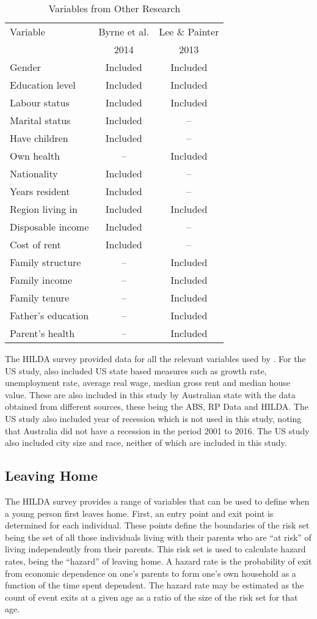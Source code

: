 \documentclass[12pt]{article}
\begin{document}
\begin{table}[htpb]
\centering
\caption{Variables from Other Research}
\label{HILDAvar}
\tabularnewline
\begin{tabular}{lcc}
\toprule
Variable & Byrne et al. & Lee \& Painter  \\
& 2014 & 2013  \\
\midrule
Gender & Included & Included \\
Education level & Included & Included \\
Labour status & Included & Included \\
Marital status & Included & -- \\
Have children & Included & -- \\
Own health & -- & Included \\
Nationality & Included & -- \\
Years resident & Included & -- \\
Region living in  & Included & Included \\
Disposable income & Included & -- \\
Cost of rent & Included & -- \\
Family structure & -- & Included \\
Family income & -- & Included \\
Family tenure & -- & Included \\
Father's education & -- & Included \\
Parent's health & -- & Included \\
\bottomrule
\end{tabular}
\end{table}

The HILDA survey provided data for all the relevant variables used by \cite{byrne2014household}. For the US study, \cite{lee2013happens} also included US state based measures such as growth rate, unemployment rate, average real wage, median gross rent and median house value. These are also included in this study by Australian state with the data obtained from different sources, these being the ABS, RP Data and HILDA. The US study also included year of recession which is not used in this study, noting that Australia did not have a recession in the period 2001 to 2016. The US study also included city size and race, neither of which are included in this study.

\subsection{Leaving Home}
The HILDA survey provides a range of variables that can be used to define when a young person first leaves home. First, an entry point and exit point is determined for each individual. These points define the boundaries of the risk set being the set of all those individuals living with their parents who are ``at risk'' of living independently from their parents. This risk set is used to calculate hazard rates, being the ``hazard'' of leaving home. A hazard rate is the probability of exit from economic dependence on one's parents to form one's own household as a function of the time spent dependent. The hazard rate may be estimated as the count of event exits at a given age as a ratio of the size of the risk set for that age.
\end{document}
